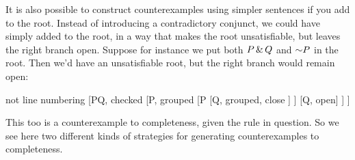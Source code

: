 It is also possible to construct counterexamples using simpler sentences if you add to the root. Instead of introducing a contradictory conjunct, we could have simply added to the root, in a way that makes the root unsatisfiable, but leaves the right branch open. Suppose for instance we put both $P \,\&\, Q$ and $\enot P$ in the root. Then we'd have an unsatisfiable root, but the right branch would remain open:
	\begin{center}
	\begin{prooftree}
	{not line numbering}
	[P\eand Q, checked
	[\enot P, grouped
		[P
		[Q, grouped, close
		]
		]
		[Q, open]
	]
	]
\end{prooftree}
\end{center}

This too is a counterexample to completeness, given the rule in question. So we see here two different kinds of strategies for generating counterexamples to completeness.

\iffalse

\practiceproblems

